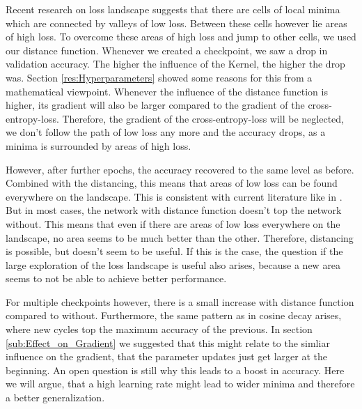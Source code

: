Recent research on loss landscape suggests that there are cells of local minima
which are connected by valleys of low loss. Between these cells however lie
areas of high loss. To overcome these areas of high loss and jump to other
cells, we used our distance function. Whenever we created a checkpoint, we saw a
drop in validation accuracy. The higher the influence of the Kernel, the higher
the drop was. Section \ref{res:Hyperparameters} showed some reasons for this
from a mathematical viewpoint. Whenever the influence of the distance function
is higher, its gradient will also be larger compared to the gradient of the
cross-entropy-loss. Therefore, the gradient of the cross-entropy-loss will be
neglected, we don't follow the path of low loss any more and the accuracy drops,
as a minima is surrounded by areas of high loss.

However, after further epochs, the accuracy recovered to the same level as
before. Combined with the distancing, this means that areas of low loss can be
found everywhere on the landscape. This is consistent with current literature
like in \cite{he2020piecewise}. But in most cases, the network with distance
function doesn't top the network without. This means that even if there are
areas of low loss everywhere on the landscape, no area seems to be much better
than the other. Therefore, distancing is possible, but doesn't seem to be
useful. If this is the case, the question if the large exploration of the loss
landscape is useful also arises, because a new area seems to not be able to
achieve better performance. 
\newline

For multiple checkpoints however, there is a small increase with distance
function compared to without. Furthermore, the same pattern as in cosine decay
arises, where new cycles top the maximum accuracy of the previous. In section
\ref{sub:Effect_on_Gradient} we suggested that this might relate to the simliar
influence on the gradient, that the parameter updates just get larger at the
beginning. An open question is still why this leads to a boost in accuracy. Here
we will argue, that a high learning rate might lead to wider minima and
therefore a better generalization.

